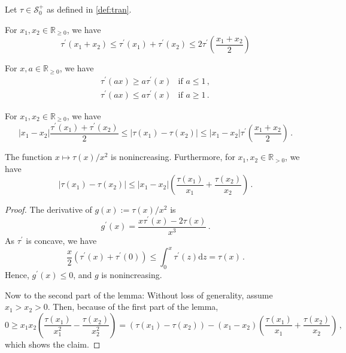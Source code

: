 \documentclass{article}
\newcommand*{\mc}[1]{\mathcal{#1}}
\newcommand{\R}{\mathbb{R}}
\newcommand{\Rp}{\R_{\geq0}}
\newcommand{\Rpp}{\R_{>0}}
\newcommand{\lb}{\left(} %
\newcommand{\rb}{\right)} %
\newcommand{\br}[1]{\lb #1 \rb} %
\newcommand{\brOf}[1]{\!\br{#1}} %
\newcommand{\absof}[1]{\vert #1 \vert} %
\newcommand{\absOf}[1]{\left\vert #1 \right\vert} %
\newcommand{\pr}{^\prime}
\newcommand{\eqcm}{\,,} %
\newcommand{\eqfs}{\,.}
\newcommand{\dl}{\mathrm{d}} %
\newcommand{\tran}{\tau}
\newcommand{\dtran}{\tau\pr}
\newcommand{\setcciz}{\mc S_0^+}
\begin{document}
Let $\tran\in\setcciz$ as defined in \cref{def:tran}.

\begin{lemma}\label{lmm:dtran:subadd}
    For $x_1, x_2\in\Rp$, we have 
    \begin{equation}
        \dtran(x_1 + x_2) \leq \dtran(x_1) + \dtran(x_2) \leq 2\dtran\brOf{\frac{x_1 + x_2}2}
    \end{equation}
\end{lemma}
%
\begin{lemma}\label{lmm:dtran:factor}
    For $x,a\in\Rp$, we have 
    \begin{align}
        \dtran(ax) \geq a\dtran(x) &\text{if } a\leq1 \eqcm\\
        \dtran(ax) \leq a\dtran(x) &\text{if } a\geq1 \eqfs
    \end{align}
\end{lemma}
%
\begin{lemma}\label{lmm:tran:diff}
    For $x_1, x_2\in\Rp$, we have 
    \begin{equation}
        \absof{x_1 - x_2}\frac{\dtran(x_1)+\dtran(x_2)}2 \leq \absof{\tran(x_1) - \tran(x_2)} \leq \absof{x_1 - x_2}\dtran\brOf{\frac{x_1+x_2}2}
        \eqfs
    \end{equation}    
\end{lemma}
%
\begin{lemma}\label{lmm:tran:sqr}
    The function $x\mapsto \tran(x)/x^2$ is nonincreasing. Furthermore, for $x_1, x_2\in\Rpp$, we have 
    \begin{equation}
        \absof{\tran(x_1) - \tran(x_2)} \leq \absOf{x_1 - x_2} \br{\frac{\tran(x_1)}{x_1} + \frac{\tran(x_2)}{x_2}}
        \eqfs
    \end{equation}    
\end{lemma}
%
\begin{proof}
    The derivative of $g(x) := \tran(x)/x^2$ is
    \begin{equation}
        g\pr(x) = \frac{x\dtran(x) - 2\tran(x)}{x^3}
        \eqfs
    \end{equation}
    As $\dtran$ is concave, we have
    \begin{equation}
        \frac{x}{2} \br{\dtran(x)+\dtran(0)} \leq \int_0^x \dtran(z) \dl z = \tran(x)
        \eqfs
    \end{equation}
    Hence, $g\pr(x) \leq 0$, and $g$ is nonincreasing.
    
    Now to the second part of the lemma: Without loss of generality, assume $x_1 > x_2 > 0$. Then, because of the first part of the lemma,
    \begin{equation}
        0
        \geq
        x_1 x_2 \br{\frac{\tran(x_1)}{x_1^2} - \frac{\tran(x_2)}{x_2^2}}
        = 
        \br{\tran(x_1) - \tran(x_2)} - (x_1-x_2) \br{\frac{\tran(x_1)}{x_1} + \frac{\tran(x_2)}{x_2}}
        \eqcm
    \end{equation}
    which shows the claim.    
\end{proof}
%
\end{document}
